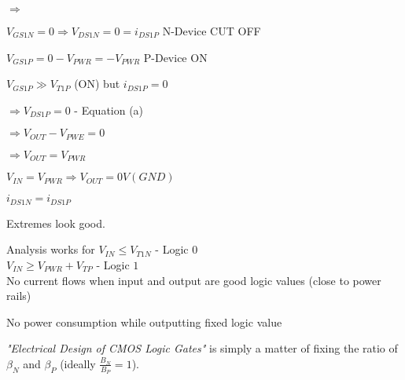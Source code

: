 \documentclass[a4paper,12pt]{article}
\begin{document}
$\Rightarrow$

$V_{GS1N} = 0 \Rightarrow V_{DS1N} = 0 = i_{DS1P}$ N-Device CUT OFF 

$V_{GS1P} = 0 -V_{PWR} = - V_{PWR}$ P-Device ON

$V_{GS1P} \gg V_{T1P}$ (ON) but $i_{DS1P} = 0$

$\Rightarrow V_{DS1P} = 0$ - Equation (a)

$\Rightarrow V_{OUT} - V_{PWE}= 0$

$\Rightarrow V_{OUT} = V_{PWR}$ 

$V_{IN} = V_{PWR} \Rightarrow V_{OUT} = 0V (GND)$

$i_{DS1N} = i_{DS1P}$

Extremes look good.

Analysis works for $V_{IN} \leq V_{T1N}$ - Logic $0$ \\
$V_{IN} \geq V_{PWR} + V_{TP}$ - Logic $1$ \\

No current flows when input and output are good logic values (close to
power rails)

No power consumption while outputting fixed logic value

\emph{"Electrical Design of CMOS Logic Gates"} is simply a matter of
fixing the ratio of $\beta_{N}$ and $\beta_{P}$ (ideally
$\frac{B_{N}}{B_{P}} = 1$).

\begin{table}[hbtp]


\end{table}
\end{document}
